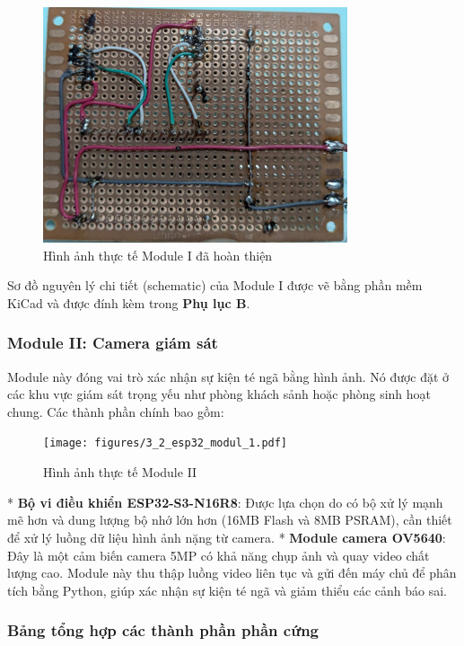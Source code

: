 \begin{figure}[H]
    \centering
    \includegraphics[width=0.8\textwidth]{figures/3_2_real_esp32_modul_1.png}
    \caption{Hình ảnh thực tế Module I đã hoàn thiện}
    \label{fig:module1_photo}
\end{figure}

Sơ đồ nguyên lý chi tiết (schematic) của Module I được vẽ bằng phần mềm KiCad và được đính kèm trong \textbf{Phụ lục B}.

\subsubsection{Module II: Camera giám sát}
\label{ssec:module_two}

Module này đóng vai trò xác nhận sự kiện té ngã bằng hình ảnh. Nó được đặt ở các khu vực giám sát trọng yếu như phòng khách sảnh hoặc phòng sinh hoạt chung. Các thành phần chính bao gồm:

\begin{figure}[H]
    \centering
    \texttt{[image: figures/3\_2\_esp32\_modul\_1.pdf]}
    \caption{Hình ảnh thực tế Module II}
    \label{fig:module2_photo}
\end{figure}

* \textbf{Bộ vi điều khiển ESP32-S3-N16R8}: Được lựa chọn do có bộ xử lý mạnh mẽ hơn và dung lượng bộ nhớ lớn hơn (16MB Flash và 8MB PSRAM), cần thiết để xử lý luồng dữ liệu hình ảnh nặng từ camera.
* \textbf{Module camera OV5640}: Đây là một cảm biến camera 5MP có khả năng chụp ảnh và quay video chất lượng cao. Module này thu thập luồng video liên tục và gửi đến máy chủ để phân tích bằng Python, giúp xác nhận sự kiện té ngã và giảm thiểu các cảnh báo sai.

\subsubsection{Bảng tổng hợp các thành phần phần cứng}
\label{ssec:component_summary}

